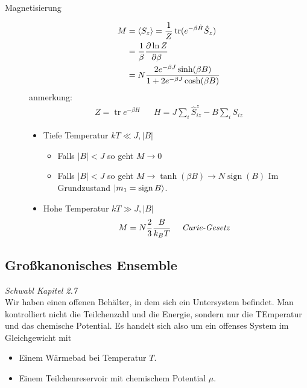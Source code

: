 \documentclass[11pt]{article}
\theoremstyle{plain}
\newcommand{\abs}[1]{\left| #1 \right|}
\newcommand{\pd}[2]{\frac{\partial #1 }{\partial #2}}
\newcommand{\trace}{\operatorname{tr}}
\newcommand{\sign}{\operatorname{sign}}
\begin{document}
\begin{description}
  \item[Magnetisierung] 
    \begin{align*}
      M & = \Braket{S_z} = \frac{1}{Z} \trace (e^{-\beta \hat{H}} \hat{S}_z) \\
        & = \frac{1}{\beta} \pd{\ln{ Z}}{\beta} \\
        & = N \frac{2 e^{-\beta J} \sinh(\beta B)}{1 + 2 e^{-\beta J} \cosh
    (\beta B)}
    \end{align*}
    anmerkung:
    \begin{align*}
      Z = \trace e^{-\beta H} && H = J \sum_{i}^{} \hat{S}_{iz}^z - B \sum_{i}^{}
      S_{iz}
    \end{align*}
    \begin{itemize}
      \item Tiefe Temperatur $k T \ll J, \abs{B}$
        \begin{itemize}
          \item Falls $\abs{B} < J$ so geht $M \to 0$ \\
          \item Falls $\abs{B} < J$ so geht $M \to \tanh(\beta B) \to N \sign(B)$
            Im Grundzustand $ \Ket{m_1 = \sign B}$.
        \end{itemize}
      \item Hohe Temperatur $k T \gg J, \abs{B}$ \\
        \begin{align*}
          M = N \frac{2}{3} \frac{B}{k_B T} && \text{ \emph{Curie-Gesetz} }
        \end{align*}
        
    \end{itemize}
\end{description}
\subsection*{Gro\ss{}kanonisches Ensemble}
\emph{Schwabl Kapitel 2.7} \\
Wir haben einen offenen Beh\"alter, in dem sich ein Untersystem befindet.
Man kontrolliert nicht die Teilchenzahl und die Energie, sondern nur die TEmperatur
und das chemische Potential.
Es handelt sich also um ein offenses System im Gleichgewicht mit
\begin{itemize}
  \item Einem W\"armebad bei Temperatur $T$.
  \item Einem Teilchenreservoir mit chemischem Potential $\mu$.
\end{itemize}
\end{document}
